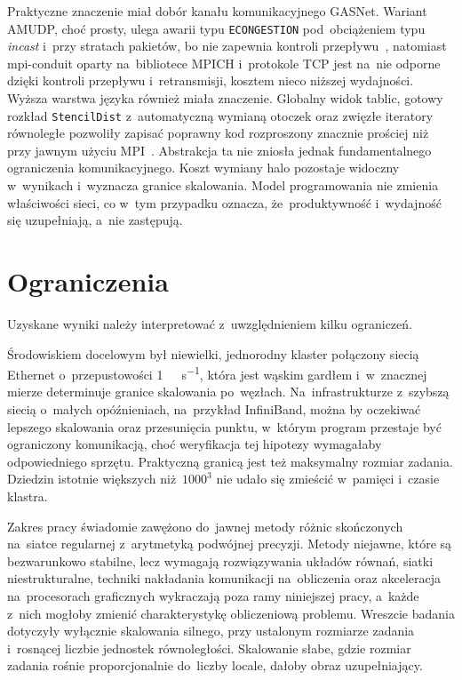 Praktyczne znaczenie miał dobór kanału komunikacyjnego GASNet. Wariant AMUDP, choć prosty, ulega awarii
typu \texttt{ECONGESTION} pod~obciążeniem typu \emph{incast} i~przy stratach pakietów, bo nie
zapewnia kontroli przepływu~\cite{incast}, natomiast mpi-conduit oparty na~bibliotece MPICH i~protokole
TCP jest na~nie odporne dzięki kontroli przepływu i~retransmisji, kosztem nieco niższej
wydajności. Wyższa warstwa języka również miała znaczenie. Globalny widok tablic, gotowy rozkład
\texttt{StencilDist} z~automatyczną wymianą otoczek oraz zwięzłe iteratory równoległe pozwoliły
zapisać poprawny kod rozproszony znacznie prościej niż przy jawnym użyciu
MPI~\cite{chapel-overview,chapel-book}. Abstrakcja ta nie zniosła jednak fundamentalnego
ograniczenia komunikacyjnego. Koszt wymiany halo pozostaje widoczny w~wynikach i~wyznacza
granice skalowania. Model programowania nie zmienia właściwości sieci, co w~tym przypadku
oznacza, że~produktywność i~wydajność się uzupełniają, a~nie zastępują.

\section{Ograniczenia}
\label{sec:ograniczenia}

Uzyskane wyniki należy interpretować z~uwzględnieniem kilku ograniczeń.

Środowiskiem docelowym był niewielki, jednorodny klaster połączony siecią
Ethernet o~przepustowości \SI{1}{\giga\bit\per\second}, która jest wąskim gardłem
i~w~znacznej mierze determinuje granice skalowania po~węzłach. Na~infrastrukturze
z~szybszą siecią o~małych opóźnieniach, na~przykład InfiniBand, można by oczekiwać
lepszego skalowania oraz przesunięcia punktu, w~którym program przestaje być
ograniczony komunikacją, choć weryfikacja tej hipotezy wymagałaby odpowiedniego sprzętu.
Praktyczną granicą jest też maksymalny rozmiar zadania. Dziedzin istotnie większych
niż~$1000^3$ nie udało się zmieścić w~pamięci i~czasie klastra.

Zakres pracy świadomie zawężono do~jawnej metody różnic skończonych na~siatce regularnej
z~arytmetyką podwójnej precyzji. Metody niejawne, które są bezwarunkowo stabilne, lecz wymagają
rozwiązywania układów równań, siatki niestrukturalne, techniki nakładania komunikacji na~obliczenia
oraz akceleracja na~procesorach graficznych wykraczają poza ramy niniejszej pracy, a~każde z~nich mogłoby
zmienić charakterystykę obliczeniową problemu. Wreszcie badania dotyczyły wyłącznie skalowania
silnego, przy ustalonym rozmiarze zadania i~rosnącej liczbie jednostek równoległości.
Skalowanie słabe, gdzie rozmiar zadania rośnie proporcjonalnie do~liczby locale,
dałoby obraz uzupełniający.


